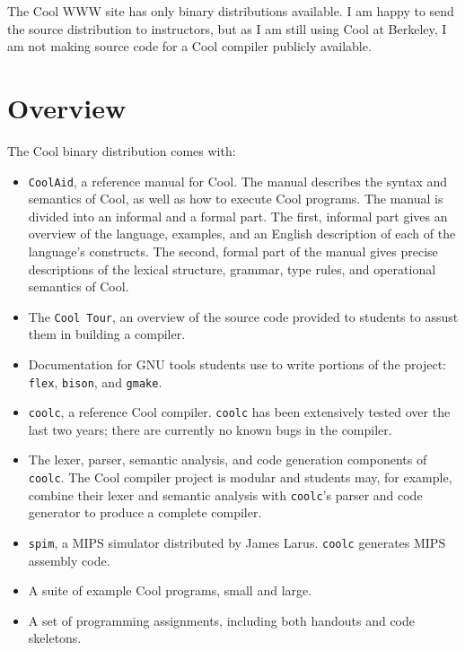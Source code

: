 \documentclass[11pt]{article}
\begin{document}
The Cool WWW site has only binary distributions available.  I am
happy to send the source distribution to instructors, but as I am
still using Cool at Berkeley, I am not making source code for a Cool
compiler publicly available.

\section{Overview}

The Cool binary distribution comes with:
\begin{itemize}

\item {\tt CoolAid}, a reference manual for Cool.  The manual describes
the syntax and semantics of Cool, as well as how to execute Cool programs.
The manual is divided into an informal and a formal part.  The first, informal
part gives an overview of the language, examples, and an English description
of each of the language's constructs.  The second, formal part of the manual
gives precise descriptions of the lexical structure, grammar, type rules,
and operational semantics of Cool.

\item The {\tt Cool Tour}, an overview of the source code provided to students
to assust them in building a compiler.

\item Documentation for GNU
      tools students use to write portions of the project: {\tt flex}, {\tt bison}, and {\tt gmake}.

\item {\tt coolc}, a reference Cool compiler.  {\tt coolc} has been extensively
tested over the last two years; there are currently no known bugs in the 
compiler.

\item The lexer, parser, semantic analysis, and code generation components
of {\tt coolc}.  The Cool compiler project is modular and
students may, for example, combine their lexer and semantic analysis with
{\tt coolc}'s parser and code generator to produce a complete compiler.

\item {\tt spim}, a MIPS simulator distributed by James Larus.  {\tt coolc}
generates MIPS assembly code.

\item A suite of example Cool programs, small and large. 

\item A set of programming assignments, including both handouts and code
skeletons.

\end{itemize}
\end{document}
